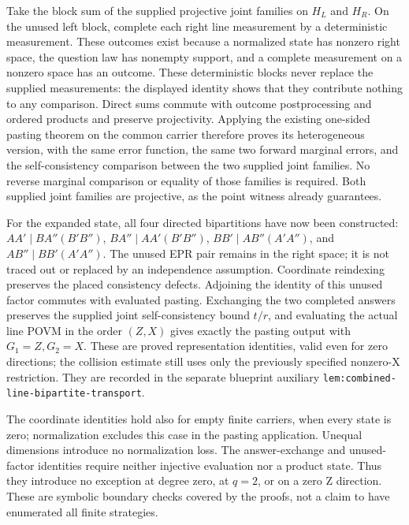 \documentclass[11pt]{article}
\begin{document}
Take the block sum of the supplied projective joint families on $H_L$ and
$H_R$. On the unused left block, complete each right line measurement by a
deterministic measurement. These outcomes exist because a normalized state
has nonzero right space, the question law has nonempty support, and a
complete measurement on a nonzero space has an outcome. These deterministic
blocks never replace the supplied measurements: the displayed identity
shows that they contribute nothing to any comparison. Direct sums commute
with outcome postprocessing and ordered products and preserve projectivity.
Applying the existing one-sided pasting theorem on the common carrier
therefore proves its heterogeneous version, with the same error function,
the same two forward marginal errors, and the self-consistency comparison
between the two supplied joint families. No reverse marginal comparison or
equality of those families is required. Both supplied joint families are
projective, as the point witness already guarantees.

For the expanded state, all four directed bipartitions have now been
constructed: $AA'\mid BA''(B'B'')$, $BA''\mid AA'(B'B'')$,
$BB'\mid AB''(A'A'')$, and $AB''\mid BB'(A'A'')$.
The unused EPR pair remains in the right space; it is not traced out or
replaced by an independence assumption. Coordinate reindexing preserves the
placed consistency defects. Adjoining the identity of this unused factor
commutes with evaluated pasting. Exchanging the two completed answers
preserves the supplied joint self-consistency bound $t/r$, and evaluating
the actual line POVM in the order $(Z,X)$ gives exactly the pasting output
with $G_1=Z,G_2=X$. These are proved representation identities, valid even
for zero directions; the collision estimate still uses only the previously
specified nonzero-X restriction. They are recorded in the separate
blueprint auxiliary \texttt{lem:combined-line-bipartite-transport}.

The coordinate identities hold also for empty finite carriers, when every
state is zero; normalization excludes this case in the pasting application.
Unequal dimensions introduce no normalization loss. The answer-exchange and
unused-factor identities require neither injective evaluation nor a product
state. Thus they introduce no exception at degree zero, at $q=2$, or on a
zero Z direction. These are symbolic boundary checks covered by the proofs,
not a claim to have enumerated all finite strategies.
\end{document}
